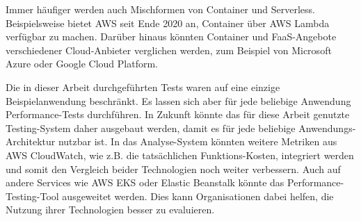 Immer häufiger werden auch Mischformen von Container und Serverless. Beispielsweise bietet AWS seit Ende 2020 an, Container über AWS Lambda verfügbar zu machen\cite{noauthor_aws_nodate-1}. Darüber hinaus könnten Container und FaaS-Angebote verschiedener Cloud-Anbieter verglichen werden, zum Beispiel von Microsoft Azure oder Google Cloud Platform.

Die in dieser Arbeit durchgeführten Tests waren auf eine einzige Beispielanwendung beschränkt. Es lassen sich aber für jede beliebige Anwendung Performance-Tests durchführen. In Zukunft könnte das für diese Arbeit genutzte Testing-System daher ausgebaut werden, damit es für jede beliebige Anwendungs-Architektur nutzbar ist. In das Analyse-System könnten weitere Metriken aus AWS CloudWatch, wie z.B. die tatsächlichen Funktions-Kosten, integriert werden und somit den Vergleich beider Technologien noch weiter verbessern. Auch auf andere Services wie AWS EKS oder Elastic Beanstalk könnte das Performance-Testing-Tool ausgeweitet werden. Dies kann Organisationen dabei helfen, die Nutzung ihrer Technologien besser zu evaluieren.
